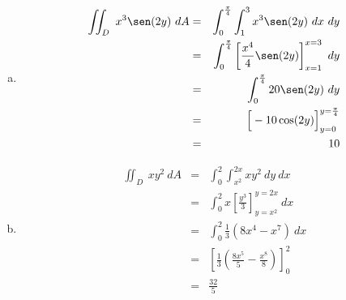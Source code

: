 \documentclass{article}
\begin{document}
\begin{enumerate}[a)]
  \item 
    \begin{eqnarray*}
      \iint_{D}\ x^3\sen(2y)\ dA 
        &=& \int_0^{\frac{\pi}{4}}\int_1^3 x^3\sen(2y)\ dx\ dy\\
        &=& \int_0^{\frac{\pi}{4}} \left[ \frac{x^4}{4}\sen(2y)\right]_{x=1}^{x=3}\ dy\\
        &=& \int_0^{\frac{\pi}{4}} 20\sen(2y)\ dy\\
        &=& \Big[ -10\cos(2y) \Big]_{y=0}^{y=\frac{\pi}{4}}\\
        &=& 10
    \end{eqnarray*}
  \item
    \begin{eqnarray*}
      \iint_{D}\ xy^2\ dA 
        &=& \int_0^2\int_{x^2}^{2x} xy^2\ dy\ dx\\
        &=& \int_0^2 x\left[ \frac{y^3}{3} \right]_{y=x^2}^{y=2x}\ dx\\
        &=& \int_0^2 \frac{1}{3}(8x^4 - x^7)\ dx\\
        &=& \left[ \frac{1}{3}\left( \frac{8x^5}{5} - \frac{x^8}{8} \right) \right]_{0}^{2}\\
        &=& \frac{32}{5}
    \end{eqnarray*}
\end{enumerate}
\end{document}
